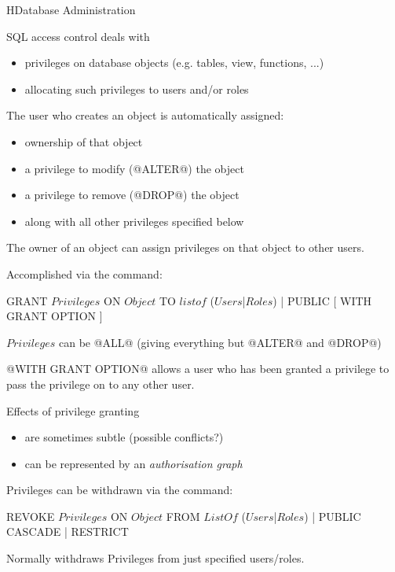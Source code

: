 \begin{lecture}{H}{Database Administration}
\begin{slide}
SQL access control deals with
\begin{itemize}
\item privileges on database objects
	{\small (e.g. tables, view, functions, ...)}
\item allocating such privileges to users and/or roles
\end{itemize}
The user who creates an object is automatically assigned:
\begin{itemize}
\item ownership of that object
\item a privilege to modify (@ALTER@) the object
\item a privilege to remove (@DROP@) the object
\item along with all other privileges specified below
\end{itemize}
\end{slide}

\begin{slide}
The owner of an object can assign privileges on that object
to other users.

Accomplished via the command:
\begin{syntax}
    GRANT \(Privileges\) ON \(Object\)
    TO \(list of\) (\(Users\)|\(Roles\)) | PUBLIC
    [ WITH GRANT OPTION ]
\end{syntax}

$Privileges$ can be @ALL@
	{\small (giving everything but @ALTER@ and @DROP@)}

@WITH GRANT OPTION@ allows a user who has been granted a privilege
to pass the privilege on to any other user.
\end{slide}

\begin{slide}
Effects of privilege granting
\begin{itemize}
\item are sometimes subtle (possible conflicts?)
\item can be represented by an {\em{authorisation graph}}
\end{itemize}
\vspace*{1cm}\begin{center}\end{center}
\end{slide}

\begin{slide}
Privileges can be withdrawn via the command:
\begin{syntax}
    REVOKE \(Privileges\) ON \(Object\)
    FROM \(ListOf\) (\(Users\)|\(Roles\)) | PUBLIC
    CASCADE | RESTRICT
\end{syntax}
Normally withdraws Privileges from just specified users/roles.


\end{slide}
\end{lecture}
